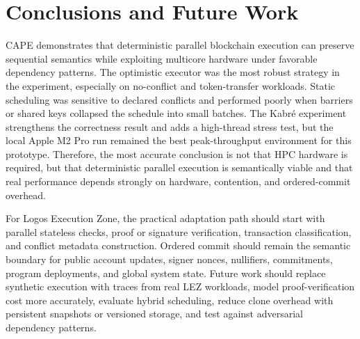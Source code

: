 \documentclass[runningheads]{llncs}
\begin{document}
\section{Conclusions and Future Work}

CAPE demonstrates that deterministic parallel blockchain execution can preserve sequential semantics while exploiting multicore hardware under favorable dependency patterns. The optimistic executor was the most robust strategy in the experiment, especially on no-conflict and token-transfer workloads. Static scheduling was sensitive to declared conflicts and performed poorly when barriers or shared keys collapsed the schedule into small batches. The Kabré experiment strengthens the correctness result and adds a high-thread stress test, but the local Apple M2 Pro run remained the best peak-throughput environment for this prototype. Therefore, the most accurate conclusion is not that HPC hardware is required, but that deterministic parallel execution is semantically viable and that real performance depends strongly on hardware, contention, and ordered-commit overhead.

For Logos Execution Zone, the practical adaptation path should start with parallel stateless checks, proof or signature verification, transaction classification, and conflict metadata construction. Ordered commit should remain the semantic boundary for public account updates, signer nonces, nullifiers, commitments, program deployments, and global system state. Future work should replace synthetic execution with traces from real LEZ workloads, model proof-verification cost more accurately, evaluate hybrid scheduling, reduce clone overhead with persistent snapshots or versioned storage, and test against adversarial dependency patterns.



\end{document}
